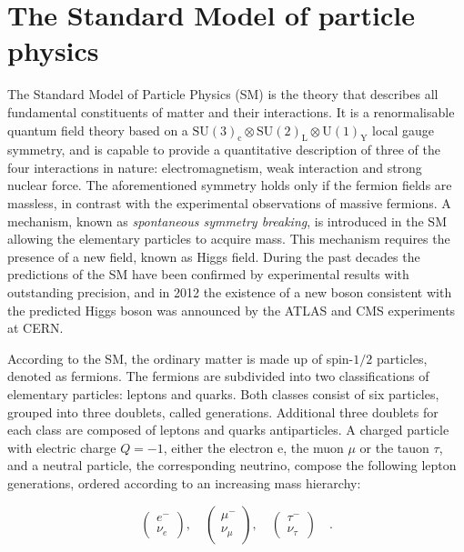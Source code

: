 \section{The Standard Model of particle physics}
\label{sec:SM}

The Standard Model of Particle Physics (SM) is the theory that describes all fundamental constituents of matter and their interactions. It is a renormalisable quantum field theory based on a $\mathrm{SU(3)_c \otimes SU(2)_L \otimes U(1)_Y}$ local gauge symmetry, and is capable to provide a quantitative description of three of the four interactions in nature: electromagnetism, weak interaction and strong nuclear force. The aforementioned symmetry holds only if the fermion fields are massless, in contrast with the experimental observations of massive fermions. A mechanism, known as \emph{spontaneous symmetry breaking}, is introduced in the SM allowing the elementary particles to acquire mass. This mechanism requires the presence of a new field, known as Higgs field. During the past decades the predictions of the SM have been confirmed by experimental results with outstanding precision, and in 2012 the existence of a new boson consistent with the predicted Higgs boson was announced by the ATLAS and CMS experiments at CERN.

According to the SM, the ordinary matter is made up of spin-$1/2$ particles, denoted as fermions. The fermions are subdivided into two classifications of elementary particles: leptons and quarks. Both classes consist of six particles, grouped into three doublets, called generations. Additional three doublets for each class are composed of leptons and quarks antiparticles. A charged particle with electric charge $Q=-1$, either the electron e, the muon $\mu$ or the tauon $\tau$, and a neutral particle, the corresponding neutrino, compose the following lepton generations, ordered according to an increasing mass hierarchy:

\begin{equation}
\label{eq:leptons}
\begin{pmatrix} e^-       \\ \nu_e      \end{pmatrix}, \quad
\begin{pmatrix} \mu^-     \\ \nu_{\mu}  \end{pmatrix}, \quad
\begin{pmatrix} \tau^-    \\ \nu_{\tau} \end{pmatrix}  \quad .
\end{equation}

